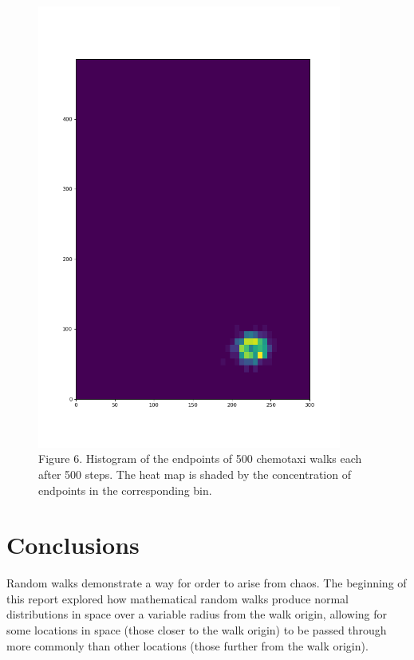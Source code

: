 \documentclass{article}
\begin{document}
\begin{figure}[h]
\centering
\includegraphics[width=10cm,keepaspectratio]{images/chemotaxi-histogram-large.png}
\captionsetup{labelformat=empty} \caption{Figure 6. Histogram of the endpoints of 500 chemotaxi walks each after 500 steps. The heat map is shaded by the concentration of endpoints in the corresponding bin.}
\end{figure}
\section{Conclusions}


  Random walks demonstrate a way for order to arise from chaos. The beginning of this report explored how mathematical random walks produce normal distributions in space over a variable radius from the walk origin, allowing for some locations in space (those closer to the walk origin) to be passed through more commonly than other locations (those further from the walk origin).
\end{document}
